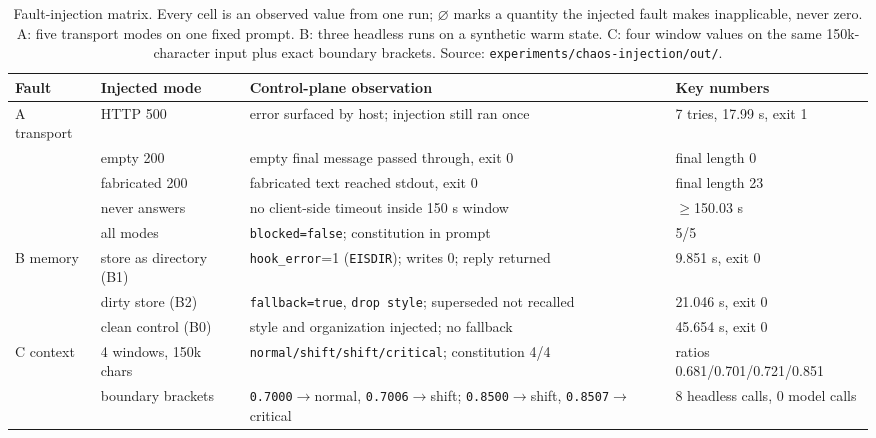 \begin{table}[t]
\centering\footnotesize
\caption{Fault-injection matrix. Every cell is an observed value from one run;
$\varnothing$ marks a quantity the injected fault makes inapplicable, never zero.
A: five transport modes on one fixed prompt. B: three headless runs on a synthetic
warm state. C: four window values on the same 150k-character input plus exact
boundary brackets. Source: \texttt{experiments/\allowbreak{}chaos-\allowbreak{}injection/\allowbreak{}out/\allowbreak{}}.}
\label{tab:chaos}
\begin{tabular}{@{}l l p{} p{}@{}}
\toprule
Fault & Injected mode & Control-plane observation & Key numbers \\
\midrule
A transport & HTTP 500 & error surfaced by host; injection still ran once & 7 tries, 17.99 s, exit 1 \\
            & empty 200 & empty final message passed through, exit 0 & final length 0 \\
            & fabricated 200 & fabricated text reached stdout, exit 0 & final length 23 \\
            & never answers & no client-side timeout inside 150 s window & $\ge$150.03 s \\
            & all modes & \texttt{blocked=false}; constitution in prompt & 5/5 \\
B memory    & store as directory (B1) & \texttt{hook\_error}=1 (\texttt{EISDIR}); writes 0; reply returned & 9.851 s, exit 0 \\
            & dirty store (B2) & \texttt{fallback=true}, \texttt{drop style}; superseded not recalled & 21.046 s, exit 0 \\
            & clean control (B0) & style and organization injected; no fallback & 45.654 s, exit 0 \\
C context   & 4 windows, 150k chars & \texttt{normal/\allowbreak{}shift/\allowbreak{}shift/\allowbreak{}critical}; constitution 4/4 & ratios 0.681/0.701/0.721/0.851 \\
            & boundary brackets & \texttt{0.7000}$\to$normal, \texttt{0.7006}$\to$shift; \texttt{0.8500}$\to$shift, \texttt{0.8507}$\to$critical & 8 headless calls, 0 model calls \\
\bottomrule
\end{tabular}
\end{table}

